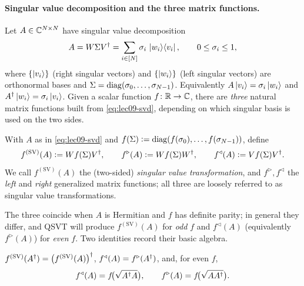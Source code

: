 \paragraph{Singular value decomposition and the three matrix functions.}
Let $A\in\mathbb{C}^{N\times N}$ have singular value decomposition
\begin{equation}
  A=W\Sigma V^{\dagger}=\sum_{i\in[N]}\sigma_i\,\ket{w_i}\!\bra{v_i},
  \qquad 0\le\sigma_i\le1,
  \label{eq:lec09-svd}
\end{equation}
where $\{\ket{v_i}\}$ (right singular vectors) and $\{\ket{w_i}\}$ (left singular
vectors) are orthonormal bases and $\Sigma=\operatorname{diag}(\sigma_0,\dots,\sigma_{N-1})$.
Equivalently $A\ket{v_i}=\sigma_i\ket{w_i}$ and $A^{\dagger}\ket{w_i}=\sigma_i\ket{v_i}$.
Given a scalar function $f\colon\mathbb{R}\to\mathbb{C}$, there are \emph{three} natural matrix
functions built from \eqref{eq:lec09-svd}, depending on which singular basis is used
on the two sides.

\begin{definition}
\label{def:lec09-gmf}
With $A$ as in \eqref{eq:lec09-svd} and $f(\Sigma)\vcentcolon=\operatorname{diag}(f(\sigma_0),\dots,
f(\sigma_{N-1}))$, define
\begin{equation}
  f^{(\mathrm{SV})}(A)\vcentcolon= W f(\Sigma) V^{\dagger},\qquad
  f^{\triangleright}(A)\vcentcolon= W f(\Sigma) W^{\dagger},\qquad
  f^{\triangleleft}(A)\vcentcolon= V f(\Sigma) V^{\dagger} .
  \label{eq:lec09-gmf}
\end{equation}
We call $f^{(\mathrm{SV})}(A)$ the (two-sided) \emph{singular value transformation},
and $f^{\triangleright},f^{\triangleleft}$ the \emph{left} and \emph{right} generalized
matrix functions; all three are loosely referred to as singular value
transformations.
\end{definition}

The three coincide when $A$ is Hermitian and $f$ has definite parity; in general they
differ, and QSVT will produce $f^{(\mathrm{SV})}(A)$ for \emph{odd} $f$ and
$f^{\triangleleft}(A)$ (equivalently $f^{\triangleright}(A)$) for \emph{even} $f$. Two
identities record their basic algebra.

\begin{proposition}
\label{prop:lec09-rel}
$f^{(\mathrm{SV})}(A^{\dagger})=\bigl(f^{(\mathrm{SV})}(A)\bigr)^{\dagger}$,
$f^{\triangleleft}(A)=f^{\triangleright}(A^{\dagger})$, and, for even $f$,
\begin{equation}
  f^{\triangleleft}(A)=f\!\bigl(\sqrt{A^{\dagger} A}\bigr),\qquad
  f^{\triangleright}(A)=f\!\bigl(\sqrt{AA^{\dagger}}\bigr).
  \label{eq:lec09-rel}
\end{equation}
\end{proposition}

